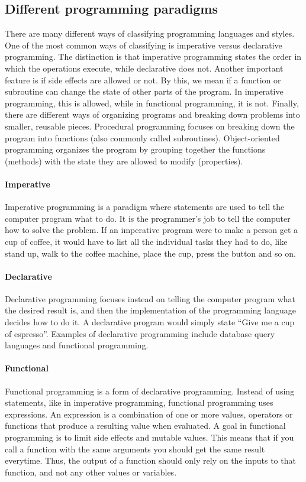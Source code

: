 \documentclass[12pt, a4paper]{article}
\begin{document}
\newpage

\subsection{Different programming paradigms}
There are many different ways of classifying programming languages and styles. One of the most common ways of classifying is imperative versus declarative programming. The distinction is that imperative programming states the order in which the operations execute, while declarative does not. Another important feature is if side effects are allowed or not. By this, we mean if a function or subroutine can change the state of other parts of the program. In imperative programming, this is allowed, while in functional programming, it is not. Finally, there are different ways of organizing programs and breaking down problems into smaller, reusable pieces. Procedural programming focuses on breaking down the program into functions (also commonly called subroutines). Object-oriented programming organizes the program by grouping together the functions (methods) with the state they are allowed to modify (properties).

\paragraph{Imperative} Imperative programming is a paradigm where statements are used to tell the computer program what to do. It is the programmer’s job to tell the computer how to solve the problem. If an imperative program were to make a person get a cup of coffee, it would have to list all the individual tasks they had to do, like stand up, walk to the coffee machine, place the cup, press the button and so on. 

\paragraph{Declarative} Declarative programming focuses instead on telling the computer program what the desired result is, and then the implementation of the programming language decides how to do it. A declarative program would simply state “Give me a cup of espresso”. Examples of declarative programming include database query languages and functional programming.

\paragraph{Functional} Functional programming is a form of declarative programming. Instead of using statements, like in imperative programming, functional programming uses expressions. An expression is a combination of one or more values, operators or functions that produce a resulting value when evaluated. A goal in functional programming is to limit side effects and mutable values. This means that if you call a function with the same arguments you should get the same result everytime. Thus, the output of a function should only rely on the inputs to that function, and not any other values or variables.
\end{document}

